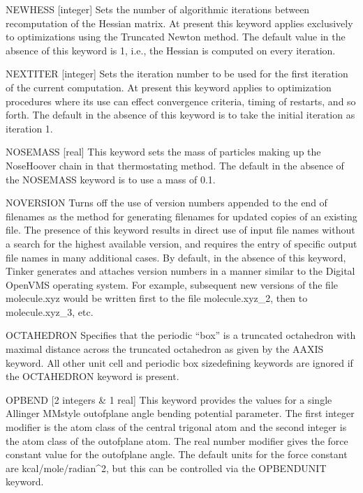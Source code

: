\documentclass[letterpaper,11pt,english]{sphinxmanual}
\begin{document}
NEWHESS {[}integer{]}     Sets the number of algorithmic iterations between recomputation of the Hessian matrix. At present this keyword applies exclusively to optimizations using the Truncated Newton method. The default value in the absence of this keyword is 1, i.e., the Hessian is computed on every iteration.

NEXTITER {[}integer{]}     Sets the iteration number to be used for the first iteration of the current computation. At present this keyword applies to optimization procedures where its use can effect convergence criteria, timing of restarts, and so forth. The default in the absence of this keyword is to take the initial iteration as iteration 1.

NOSE\sphinxhyphen{}MASS {[}real{]}     This keyword sets the mass of particles making up the Nose\sphinxhyphen{}Hoover chain in that thermostating method. The default in the absence of the NOSE\sphinxhyphen{}MASS keyword is to use a mass of 0.1.

NOVERSION     Turns off the use of version numbers appended to the end of filenames as the method for generating filenames for updated copies of an existing file. The presence of this keyword results in direct use of input file names without a search for the highest available version, and requires the entry of specific output file names in many additional cases. By default, in the absence of this keyword, Tinker generates and attaches version numbers in a manner similar to the Digital OpenVMS operating system. For example, subsequent new versions of the file molecule.xyz would be written first to the file molecule.xyz\_2, then to molecule.xyz\_3, etc.

OCTAHEDRON     Specifies that the periodic “box” is a truncated octahedron with maximal distance across the truncated octahedron as given by the A\sphinxhyphen{}AXIS keyword. All other unit cell and periodic box size\sphinxhyphen{}defining keywords are ignored if the OCTAHEDRON keyword is present.

OPBEND {[}2 integers \& 1 real{]}     This keyword provides the values for a single Allinger MM\sphinxhyphen{}style out\sphinxhyphen{}of\sphinxhyphen{}plane angle bending potential parameter. The first integer modifier is the atom class of the central trigonal atom and the second integer is the atom class of the out\sphinxhyphen{}of\sphinxhyphen{}plane atom. The real number modifier gives the force constant value for the out\sphinxhyphen{}of\sphinxhyphen{}plane angle. The default units for the force constant are kcal/mole/radian\textasciicircum{}2, but this can be controlled via the OPBENDUNIT keyword.
\end{document}
